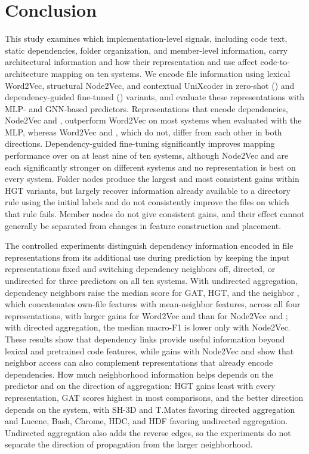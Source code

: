 \section{Conclusion\label{sec:conclusion}}

This study examines which implementation-level signals, including code text, static dependencies, folder organization, and member-level information, carry architectural information and how their representation and use affect code-to-architecture mapping on ten systems. We encode file information using lexical Word2Vec, structural Node2Vec, and contextual UniXcoder in zero-shot (\zs{}) and dependency-guided fine-tuned (\ft{}) variants, and evaluate these representations with MLP- and GNN-based predictors. Representations that encode dependencies, Node2Vec and \ft{}, outperform Word2Vec on most systems when evaluated with the MLP, whereas Word2Vec and \zs{}, which do not, differ from each other in both directions. Dependency-guided fine-tuning significantly improves mapping performance over \zs{} on at least nine of ten systems, although Node2Vec and \ft{} are each significantly stronger on different systems and no representation is best on every system. Folder nodes produce the largest and most consistent gains within HGT variants, but largely recover information already available to a directory rule using the initial labels and do not consistently improve the files on which that rule fails. Member nodes do not give consistent gains, and their effect cannot generally be separated from changes in feature construction and placement.

The controlled experiments distinguish dependency information encoded in file representations from its additional use during prediction by keeping the input representations fixed and switching dependency neighbors off, directed, or undirected for three predictors on all ten systems. With undirected aggregation, dependency neighbors raise the median score for GAT, HGT, and the neighbor \mlp{}, which concatenates own-file features with mean-neighbor features, across all four representations, with larger gains for Word2Vec and \zs{} than for Node2Vec and \ft{}; with directed aggregation, the median macro-F1 is lower only with Node2Vec. These results show that dependency links provide useful information beyond lexical and pretrained code features, while gains with Node2Vec and \ft{} show that neighbor access can also complement representations that already encode dependencies. How much neighborhood information helps depends on the predictor and on the direction of aggregation: HGT gains least with every representation, GAT scores highest in most comparisons, and the better direction depends on the system, with SH-3D and T.Mates favoring directed aggregation and Lucene, Bash, Chrome, HDC, and HDF favoring undirected aggregation. Undirected aggregation also adds the reverse edges, so the experiments do not separate the direction of propagation from the larger neighborhood.


